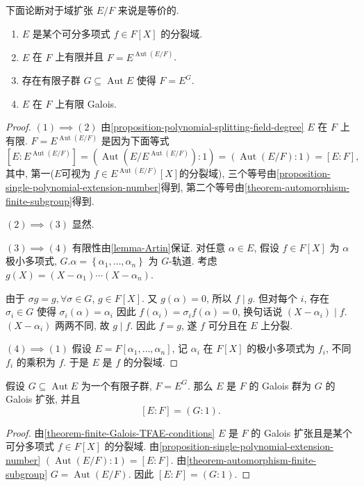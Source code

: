 \begin{theorem}
  \label{theorem-finite-Galois-TFAE-conditions}
  下面论断对于域扩张 \( E / F \) 来说是等价的.
  \begin{enumerate}
    \item \( E \) 是某个可分多项式 \( f \in F[X] \) 的分裂域.
    \item \( E \) 在 \( F \) 上有限并且 \( F = E^{\operatorname{Aut}(E/F)} \).
    \item 存在有限子群 \( G \subseteq \operatorname{Aut}E \) 使得 \( F = E^G \).
    \item \( E \) 在 \( F \) 上有限 Galois.
  \end{enumerate}
\end{theorem}
\begin{proof}
  \( (1) \implies (2) \)
  由\cref{proposition-polynomial-splitting-field-degree} \( E \) 在 \( F \)
  上有限.
  \( F = E^{\operatorname{Aut}(E/F)} \) 是因为下面等式
  \[
    [E:E^{\operatorname{Aut}(E/F)}] =
    (\operatorname{Aut}(E/E^{\operatorname{Aut}(E/F)}):1) =
    (\operatorname{Aut}(E/F):1) = [E:F],
  \]
  其中, 第一(\( E \)可视为 \( f \in E^{\operatorname{Aut}(E/F)}[X] \)的分裂域),
  三个等号由\cref{proposition-single-polynomial-extension-number}得到,
  第二个等号由\cref{theorem-automorphism-finite-subgroup}得到.

  \( (2) \implies (3) \) 显然.

  \( (3) \implies (4) \)
  有限性由\cref{lemma-Artin}保证.
  对任意 \( \alpha \in E \), 假设 \( f \in F[X] \) 为 \( \alpha \) 极小多项式,
  \( G.\alpha = \left\lbrace \alpha_1, \ldots, \alpha_n \right\rbrace \) 为 \( G
  \)-轨道.
  考虑 \( g(X) = (X - \alpha_1)\cdots(X - \alpha_n) \).

  由于 \( \sigma g = g, \forall \sigma \in G \), \( g \in F[X] \).
  又 \( g(\alpha) = 0 \), 所以 \( f \mid g \).
  但对每个 \( i \), 存在 \( \sigma_i \in G \) 使得 \( \sigma_i(\alpha) =
  \alpha_i \) 因此 \( f(\alpha_i) = \sigma_i f(\alpha) = 0 \), 换句话说 \( (X -
  \alpha_i) \mid f \).
  \( (X - \alpha_i) \) 两两不同, 故 \( g \mid f \).
  因此 \( f = g \), 遂 \( f \) 可分且在 \( E \) 上分裂.

  \( (4) \implies (1) \)
  假设 \( E = F[\alpha_1, \ldots, \alpha_n] \), 记 \( \alpha_i \) 在 \( F[X] \)
  的极小多项式为 \( f_i \), 不同 \( f_i \) 的乘积为 \( f \).
  于是 \( E \) 是 \( f \) 的分裂域.
\end{proof}

\begin{corollary}[Artin定理]
  \label{corollary-Artin-theorem}
  假设 \( G \subseteq \operatorname{Aut} E \) 为一个有限子群, \( F = E^G \).
  那么 \( E \) 是 \( F \) 的 Galois 群为 \( G \) 的 Galois 扩张, 并且
  \[
    [E:F] = (G : 1).
  \]
\end{corollary}
\begin{proof}
  由\cref{theorem-finite-Galois-TFAE-conditions} \( E \) 是 \( F \) 的 Galois
  扩张且是某个可分多项式 \( f \in F[X] \) 的分裂域.
  由\cref{proposition-single-polynomial-extension-number} \(
  (\operatorname{Aut}(E/F):1) = [E:F] \).
  由\cref{theorem-automorphism-finite-subgroup} \( G = \operatorname{Aut}(E/F)
  \).
  因此 \( [E:F] = (G:1) \).
\end{proof}

